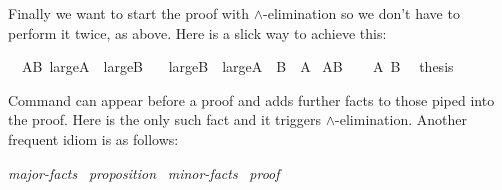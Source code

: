 \begin{isabellebody}
\begin{isamarkuptext}
Finally we want to start the proof with $\land$-elimination so we
don't have to perform it twice, as above. Here is a slick way to
achieve this:%
\end{isamarkuptext}%
\isamarkupfalse%
\ \ AB{\isacharcolon}\ {\isachardoublequote}large{\isacharunderscore}A\ {\isasymand}\ large{\isacharunderscore}B{\isachardoublequote}\isanewline
\ \ \ {\isachardoublequote}large{\isacharunderscore}B\ {\isasymand}\ large{\isacharunderscore}A{\isachardoublequote}\ {\isacharparenleft}\ {\isachardoublequote}{\isacharquery}B\ {\isasymand}\ {\isacharquery}A{\isachardoublequote}{\isacharparenright}\isanewline
%
\isadelimproof
%
\endisadelimproof
%
\isatagproof
\isamarkupfalse%
\ AB\isanewline
\isamarkupfalse%
\isanewline
\ \ \isamarkupfalse%
\ {\isachardoublequote}{\isacharquery}A{\isachardoublequote}\ {\isachardoublequote}{\isacharquery}B{\isachardoublequote}\ \isamarkupfalse%
\ {\isacharquery}thesis\ \isamarkupfalse%
\isacommand{{\isachardot}{\isachardot}}\isanewline
\isamarkupfalse%
%
\endisatagproof
{\isafoldproof}%
%
\isadelimproof
%
\endisadelimproof
\isamarkuptrue%
%
\begin{isamarkuptext}%
\noindent Command  can appear before a proof
and adds further facts to those piped into the proof. Here 
is the only such fact and it triggers $\land$-elimination. Another
frequent idiom is as follows:
\begin{center}
 \emph{major-facts}~
 \emph{proposition}~
 \emph{minor-facts}~
\emph{proof}
\end{center}


\end{isamarkuptext}
\end{isabellebody}

